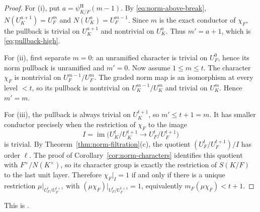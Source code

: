 \documentclass[11pt]{amsart}
\theoremstyle{definition}
\theoremstyle{remark}
\newcommand{\HerbPsi}{\psi^{\mathrm H}}
\begin{document}
\begin{proof}
For (i), put $a=\HerbPsi_{K/F}(m-1)$.  By
\eqref{eq:norm-above-break}, $N(U_K^{a+1})=U_F^m$ and
$N(U_K^a)=U_F^{m-1}$.  Since $m$ is the exact conductor of $\chi_F$,
the pullback is trivial on $U_K^{a+1}$ and nontrivial on $U_K^a$.
Thus $m'=a+1$, which is \eqref{eq:pullback-high}.

For (ii), first separate $m=0$: an unramified character is trivial on
$U_F^0$, hence its norm pullback is unramified and $m'=0$.  Now assume
$1\le m\le t$.  The character $\chi_F$ is nontrivial on
$U_F^{m-1}/U_F^m$.  The graded norm map is an isomorphism at every
level $<t$, so its pullback is nontrivial on
$U_K^{m-1}/U_K^m$ and trivial on $U_K^m$.  Hence $m'=m$.

For (iii), the pullback is always trivial on $U_K^{t+1}$, so
$m'\le t+1=m$.  It has smaller conductor precisely when the restriction
of $\chi_F$ to the image
\[
 I=\operatorname{im}\bigl(U_K^t/U_K^{t+1}\longrightarrow
                          U_F^t/U_F^{t+1}\bigr)
\]
is trivial.  By Theorem~\ref{thm:norm-filtration}(c), the quotient
$(U_F^t/U_F^{t+1})/I$ has order $\ell$.  The proof of
Corollary~\ref{cor:norm-characters} identifies this quotient with
$F^\times/N(K^\times)$, so its character group is exactly the
restriction of $S(K/F)$ to the last unit layer.  Therefore
$\chi_F|_I=1$ if and only if there is a unique restriction
$\mu|_{U_F^t/U_F^{t+1}}$ with
$(\mu\chi_F)|_{U_F^t/U_F^{t+1}}=1$, equivalently
$m_F(\mu\chi_F)<t+1$.
\end{proof}

This is \cite[Lemmas 8.8 and 8.12, pp.~73 and 78--79]{Langlands}.
\end{document}
